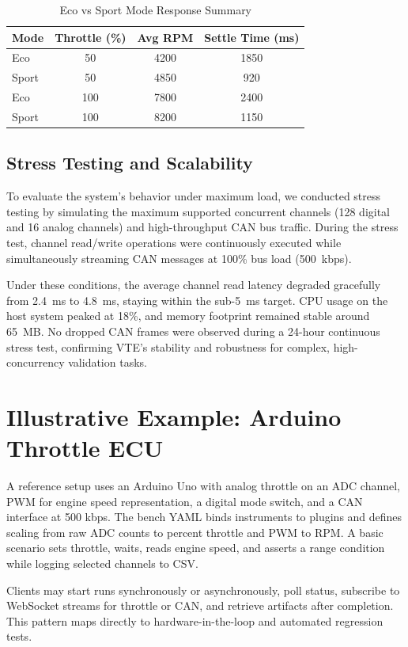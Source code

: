 \documentclass[conference]{IEEEtran}
\begin{document}
\begin{table}[htbp]
\caption{Eco vs Sport Mode Response Summary}
\centering
\begin{tabular}{lccc}
\toprule
\textbf{Mode} & \textbf{Throttle (\%)} & \textbf{Avg RPM} & \textbf{Settle Time (ms)} \\
\midrule
Eco & 50 & 4200 & 1850 \\
Sport & 50 & 4850 & 920 \\
Eco & 100 & 7800 & 2400 \\
Sport & 100 & 8200 & 1150 \\
\bottomrule
\end{tabular}
\label{tab:mode_comparison}
\end{table}

\subsection{Stress Testing and Scalability}
To evaluate the system's behavior under maximum load, we conducted stress testing by simulating the maximum supported concurrent channels (128 digital and 16 analog channels) and high-throughput CAN bus traffic. During the stress test, channel read/write operations were continuously executed while simultaneously streaming CAN messages at 100\% bus load (500~kbps). 

Under these conditions, the average channel read latency degraded gracefully from 2.4~ms to 4.8~ms, staying within the sub-5~ms target. CPU usage on the host system peaked at 18\%, and memory footprint remained stable around 65~MB. No dropped CAN frames were observed during a 24-hour continuous stress test, confirming VTE's stability and robustness for complex, high-concurrency validation tasks.

\section{Illustrative Example: Arduino Throttle ECU}

A reference setup uses an Arduino Uno with analog throttle on an ADC channel, PWM for engine speed representation, a digital mode switch, and a CAN interface at 500 kbps. The bench YAML binds instruments to plugins and defines scaling from raw ADC counts to percent throttle and PWM to RPM. A basic scenario sets throttle, waits, reads engine speed, and asserts a range condition while logging selected channels to CSV.

Clients may start runs synchronously or asynchronously, poll status, subscribe to WebSocket streams for throttle or CAN, and retrieve artifacts after completion. This pattern maps directly to hardware-in-the-loop and automated regression tests.
\end{document}

